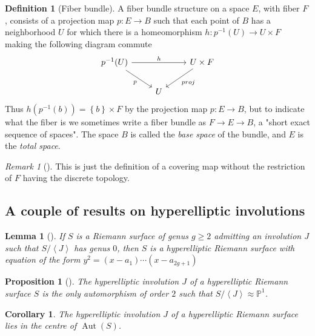 \documentclass[reqno]{amsart}
\newtheorem{lemma}[theorem]{Lemma}
\newtheorem{proposition}[theorem]{Proposition}
\newtheorem{corollary}[theorem]{Corollary}
\theoremstyle{definition}
\newtheorem{definition}[theorem]{Definition}
\theoremstyle{remark}
\newtheorem*{remark}{Remark}
\DeclareMathOperator{\Aut}{Aut}
\begin{document}
\begin{definition}[Fiber bundle]
    A fiber bundle structure on a space $E$, with fiber
    $F$, consists of a projection map
    $p \colon E \to B$ such that each point of $B$ has
    a neighborhood $U$ for which there is a homeomorphism
    $h \colon p^{-1}(U) \to U \times F$ making
    the following diagram commute
    \begin{equation*}
    \begin{tikzcd}
        p^{-1}(U) \ar[rr, "h"] \ar[dr, "p"'] & & U \times F
        \ar[dl, "proj"] \\
                                            & U&
    \end{tikzcd}
    \end{equation*}
    Thus
    $h \left( p^{-1}(b) \right) 
    = \left\{ b \right\} \times F$ by the projection map 
    $p \colon E \to B$, but to indicate what the fiber
    is we sometimes write a fiber bundle as
    $F \to E \to B$, a "short exact sequence of spaces".
    The space $B$ is called the \textit{base space} of the
    bundle, and $E$ is the \textit{total space}.
\end{definition}          

\begin{remark}[]
    This is just the definition of a covering map
    without the restriction of $F$ having the discrete
    topology.
\end{remark}
          
\subsection{A couple of results on hyperelliptic involutions}

\begin{lemma}[]
    If $S$ is a Riemann surface of genus $g \ge 2$ admitting
    an involution $J$ such that
    $S / \left<J \right>$ has genus $0$, then
    $S$ is a hyperelliptic Riemann surface with
    equation of the form
    $y^2 = \left( x-a_1 \right) \cdots
    \left( x- a_{2g+1} \right) $
\end{lemma}

\begin{proposition}[]
    The hyperelliptic involution
    $J$ of a hyperelliptic Riemann surface $S$ is
    the only automorphism of order $2$ such that
    $S / \left<J \right> \approx \mathbb{P}^{1}$.
\end{proposition}

\begin{corollary}
    The hyperelliptic involution $J$ of a hyperelliptic
    Riemann surface lies in the centre of
    $\Aut (S)$.
\end{corollary}
          




\newpage


\end{document}
